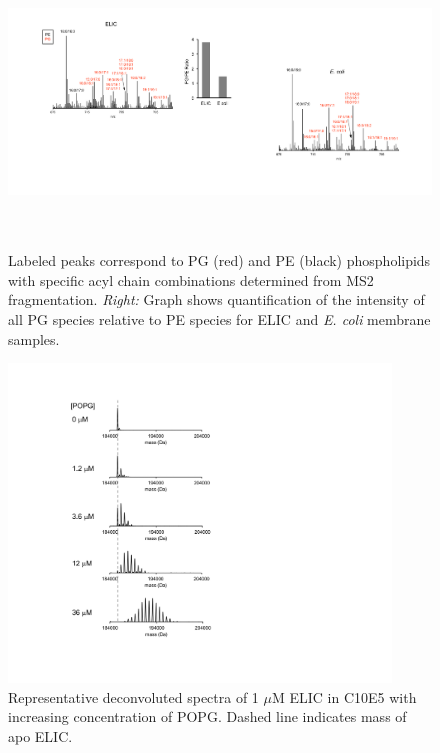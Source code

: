 \documentclass[12pt]{ruthesis_nofloat}
\begin{document}
\begin{figure}

\includegraphics[width=5.95065in,height=3.02741in]{./pandoc_test/media/image11.pdf}

\caption[MS1 spectra of lipid extract from purified
ELIC in DDM and \emph{E. coli} membranes.] {Labeled peaks correspond to PG
(red) and PE (black) phospholipids with specific acyl chain combinations
determined from MS2 fragmentation. \emph{Right:} Graph shows
quantification of the intensity of all PG species relative to PE species
for ELIC and \emph{E. coli} membrane samples.}\label{fig:Supplementary Fig. 1} 
\end{figure}

\renewcommand{\thefigure}{C2}

\begin{figure}
\includegraphics[width=4in]{./pandoc_test/media/image12.pdf}
\caption{Representative deconvoluted spectra of 1
$\mu$M ELIC in C10E5 with increasing concentration of POPG. Dashed line
indicates mass of apo ELIC.}\label{fig:Supplementary Fig. 2} 
\end{figure}
\renewcommand{\thefigure}{C3}
\end{document}
